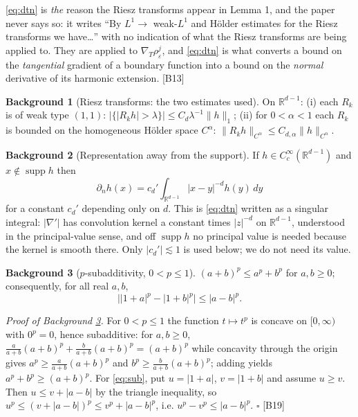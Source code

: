 \documentclass[11pt,reqno]{amsart}
\theoremstyle{plain}
\theoremstyle{definition}
\newtheorem*{bg}{Background}
\theoremstyle{plain}
\theoremstyle{definition}
\theoremstyle{remark}
\newcommand{\Rdm}{\mathbb{R}^{d-1}}
\newcommand{\nd}{\partial_n}
\DeclareMathOperator{\supp}{supp}
\newcommand{\Ledger}[1]{{\scriptsize\textsf{[#1]}}}
\begin{document}
\begin{filled}
\eqref{eq:dtn} is \emph{the} reason the Riesz transforms appear in Lemma 1, and the
paper never says so: it writes ``By $L^1\to$ weak-$L^1$ and H\"older estimates for the
Riesz transforms we have\dots'' with no indication of what the Riesz transforms are
being applied to. They are applied to $\nabla_T\rho^j_\varepsilon$, and
\eqref{eq:dtn} is what converts a bound on the \emph{tangential} gradient of a
boundary function into a bound on the \emph{normal} derivative of its harmonic
extension. \Ledger{B13}
\end{filled}

\begin{bg}[Riesz transforms: the two estimates used]\label{bg:riesz}
On $\Rdm$: (i) each $R_k$ is of weak type $(1,1)$:
$|\{|R_kh|>\lambda\}|\le C_d\lambda^{-1}\|h\|_1$; (ii) for $0<\alpha<1$ each $R_k$
is bounded on the homogeneous H\"older space $C^\alpha$:
$\|R_kh\|_{C^\alpha}\le C_{d,\alpha}\|h\|_{C^\alpha}$.
\end{bg}

\begin{bg}[Representation away from the support]\label{bg:rep}
If $h\in C_c^\infty(\Rdm)$ and $x\notin\supp h$ then
\[\nd h(x)=c_d'\int_{\Rdm}|x-y|^{-d}h(y)\,dy\]
for a constant $c_d'$ depending only on $d$. This is \eqref{eq:dtn} written as a
singular integral: $|\nabla'|$ has convolution kernel a constant times $|z|^{-d}$
on $\Rdm$, understood in the principal-value sense, and off $\supp h$ no principal
value is needed because the kernel is smooth there. Only $|c_d'|\lesssim1$ is used
below; we do not need its value.
\end{bg}

\begin{bg}[$p$-subadditivity, $0<p\le1$]\label{bg:sub}
$(a+b)^p\le a^p+b^p$ for $a,b\ge0$; consequently, for all real $a,b$,
\begin{equation}\label{eq:sub}
  \bigl||1+a|^p-|1+b|^p\bigr|\le|a-b|^p .
\end{equation}
\end{bg}

\begin{filled}
\emph{Proof of Background \ref{bg:sub}.} For $0<p\le1$ the function $t\mapsto t^p$
is concave on $[0,\infty)$ with $0^p=0$, hence subadditive: for $a,b\ge0$,
$\frac{a}{a+b}(a+b)^p+\frac{b}{a+b}(a+b)^p=(a+b)^p$ while concavity through the
origin gives $a^p\ge\frac{a}{a+b}(a+b)^p$ and $b^p\ge\frac{b}{a+b}(a+b)^p$; adding
yields $a^p+b^p\ge(a+b)^p$. For \eqref{eq:sub}, put $u=|1+a|$, $v=|1+b|$ and assume
$u\ge v$. Then $u\le v+|a-b|$ by the triangle inequality, so
$u^p\le(v+|a-b|)^p\le v^p+|a-b|^p$, i.e. $u^p-v^p\le|a-b|^p$. \hfill$\square$
\Ledger{B19}
\end{filled}
\end{document}
